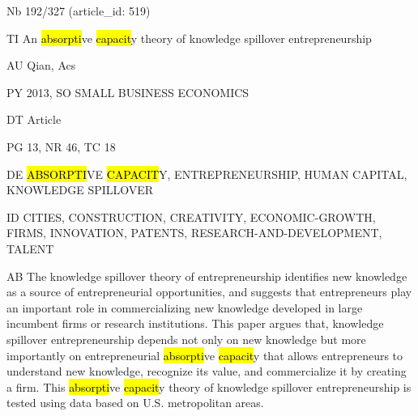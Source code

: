 \documentclass[a4paper]{article}
\begin{document}
\vspace*{-2cm}
Nb \tabto{0cm}192/327 (article\_id: 519)\par
TI \tabto{0cm}An \hl{absorpti}ve \hl{capacit}y theory of knowledge spillover entrepreneurship\par
AU \tabto{0cm}Qian, Acs\par
PY \tabto{0cm}2013, SO SMALL BUSINESS ECONOMICS\par
DT \tabto{0cm}Article\par
PG \tabto{0cm}13, NR 46, TC 18\par
DE \tabto{0cm}\hl{ABSORPTI}VE \hl{CAPACIT}Y, ENTREPRENEURSHIP, HUMAN CAPITAL, KNOWLEDGE SPILLOVER\par
ID \tabto{0cm}CITIES, CONSTRUCTION, CREATIVITY, ECONOMIC-GROWTH, FIRMS, INNOVATION, PATENTS, RESEARCH-AND-DEVELOPMENT, TALENT\par
AB \tabto{0cm}The knowledge spillover theory of entrepreneurship identifies new knowledge as a source of entrepreneurial opportunities, and suggests that entrepreneurs play an important role in commercializing new knowledge developed in large incumbent firms or research institutions. This paper argues that, knowledge spillover entrepreneurship depends not only on new knowledge but more importantly on entrepreneurial \hl{absorpti}ve \hl{capacit}y that allows entrepreneurs to understand new knowledge, recognize its value, and commercialize it by creating a firm. This \hl{absorpti}ve \hl{capacit}y theory of knowledge spillover entrepreneurship is tested using data based on U.S. metropolitan areas.\par
\clearpage
\end{document}
